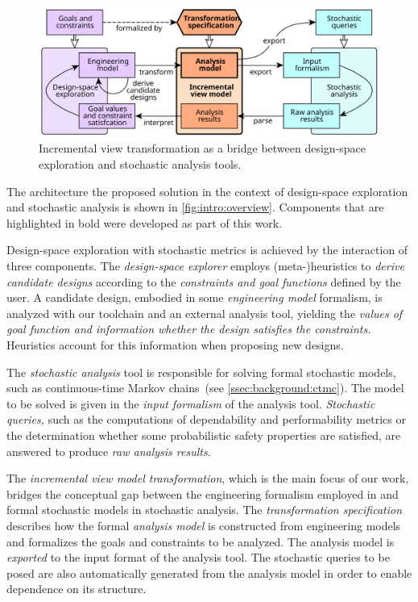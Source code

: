 \begin{figure}
  \centering
  \includegraphics[scale=0.9]{figures/overview}
  \caption{Incremental view transformation as a bridge between design-space exploration and stochastic analysis tools.}
  \label{fig:intro:overview}
\end{figure}

The architecture the proposed solution in the context of design-space exploration and stochastic analysis is shown in \vref{fig:intro:overview}. Components that are highlighted in bold were developed as part of this work.

Design-space exploration with stochastic metrics is achieved by the interaction of three components. The \emph{design-space explorer} employs (meta-)heuristics to \emph{derive candidate designs} according to the \emph{constraints and goal functions} defined by the user. A candidate design, embodied in some \emph{engineering model} formalism, is analyzed with our toolchain and an external analysis tool, yielding the \emph{values of goal function and information whether the design satisfies the constraints.} Heuristics account for this information when proposing new designs.

The \emph{stochastic analysis} tool is responsible for solving formal stochastic models, such as continuous-time Markov chains~(see \vref{ssec:background:ctmc}). The model to be solved is given in the \emph{input formalism} of the analysis tool. \emph{Stochastic queries,} such as the computations of dependability and performability metrics or the determination whether some probabilistic safety properties are satisfied, are answered to produce \emph{raw analysis results}. 

The \emph{incremental view model transformation}, which is the main focus of our work, bridges the conceptual gap between the engineering formalism employed in  and formal stochastic models in stochastic analysis. The \emph{transformation specification} describes how the formal \emph{analysis model} is constructed from engineering models and formalizes the goals and constraints to be analyzed. The analysis model is \emph{exported} to the input format of the analysis tool. The stochastic queries to be posed are also automatically generated from the analysis model in order to enable dependence on its structure.

